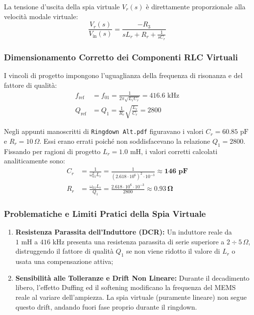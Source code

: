 \documentclass[11pt,a4paper]{article}
\begin{document}
La tensione d'uscita della spia virtuale $V_r(s)$ è direttamente proporzionale alla velocità modale virtuale:
\begin{equation}
    \frac{V_r(s)}{V_{\text{in}}(s)} = \frac{-R_3}{s L_r + R_r + \frac{1}{s C_r}}
\end{equation}

\subsubsection{Dimensionamento Corretto dei Componenti RLC Virtuali}
I vincoli di progetto impongono l'uguaglianza della frequenza di risonanza e del fattore di qualità:
\begin{align}
    f_{\text{ref}} &= f_{01} = \frac{1}{2\pi \sqrt{L_r C_r}} = 416.6\text{ kHz} \\
    Q_{\text{ref}} &= Q_1 = \frac{1}{R_r} \sqrt{\frac{L_r}{C_r}} = 2800
\end{align}

\begin{corrbox}
Negli appunti manoscritti di \texttt{Ringdown Alt.pdf} figuravano i valori $C_r = 60.85\text{ pF}$ e $R_r = 10\,\Omega$. Essi erano errati poiché non soddisfacevano la relazione $Q_1 = 2800$.
Fissando per ragioni di progetto $L_r = 1.0\text{ mH}$, i valori corretti calcolati analiticamente sono:
\begin{align}
    C_r &= \frac{1}{\omega_{01}^2 L_r} = \frac{1}{(2.618 \cdot 10^6)^2 \cdot 10^{-3}} \approx \mathbf{146\text{ pF}} \\
    R_r &= \frac{\omega_{01} L_r}{Q_1} = \frac{2.618 \cdot 10^6 \cdot 10^{-3}}{2800} \approx \mathbf{0.93\,\Omega}
\end{align}
\end{corrbox}

\subsubsection{Problematiche e Limiti Pratici della Spia Virtuale}
\begin{enumerate}
    \item \textbf{Resistenza Parassita dell'Induttore (DCR):} Un induttore reale da $1\text{ mH}$ a $416\text{ kHz}$ presenta una resistenza parassita di serie superiore a $2 \div 5\,\Omega$, distruggendo il fattore di qualità $Q_1$ se non viene ridotto il valore di $L_r$ o usata una compensazione attiva;
    \item \textbf{Sensibilità alle Tolleranze e Drift Non Lineare:} Durante il decadimento libero, l'effetto Duffing ed il softening modificano la frequenza del MEMS reale al variare dell'ampiezza. La spia virtuale (puramente lineare) non segue questo drift, andando fuori fase proprio durante il ringdown.
\end{enumerate}
\end{document}
